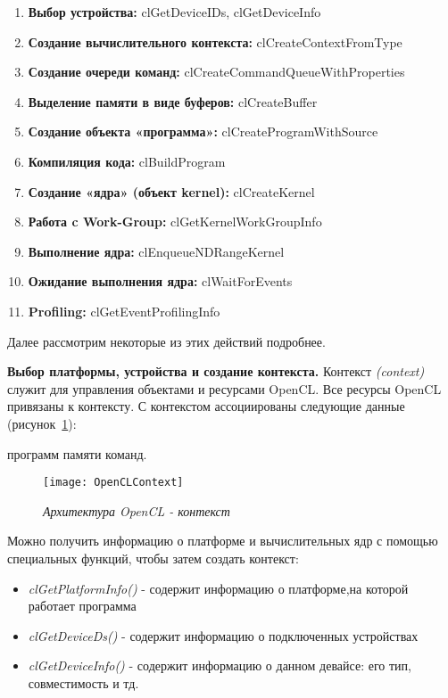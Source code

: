{\begin{enumerate}
			\item\textbf{Выбор устройства:} clGetDeviceIDs, clGetDeviceInfo
			\item\textbf{Создание вычислительного контекста:} clCreateContextFromType
			\item\textbf{Создание очереди команд:} clCreateCommandQueueWithProperties
			\item\textbf{Выделение памяти в виде буферов:} clCreateBuffer
			\item\textbf{Создание объекта «программа»:} clCreateProgramWithSource
			\item\textbf{Компиляция кода:} clBuildProgram
			\item\textbf{Создание «ядра» (объект kernel):} clCreateKernel
			\item\textbf{Работа c Work-Group:} clGetKernelWorkGroupInfo 
			\item\textbf{Выполнение ядра:} clEnqueueNDRangeKernel 
			\item\textbf{Ожидание выполнения ядра:} clWaitForEvents 
			\item\textbf{Profiling:} clGetEventProfilingInfo
		\end{enumerate}
	Далее рассмотрим некоторые из этих действий подробнее.
	\par\textbf{Выбор платформы, устройства и создание контекста.} Контекст \textit{(context)} служит для управления объектами и ресурсами OpenCL. Все ресурсы OpenCL привязаны к контексту. С контекстом ассоциированы следующие данные (рисунок~\ref{OpenCLContext:image}):
		\begin{itemize}
			 программ
			 памяти
			 команд.
		\end{itemize}
	\begin{figure}[H]
		\texttt{[image: OpenCLContext]}
		\caption{\textit{Архитектура OpenCL - контекст}}
		\label{OpenCLContext:image}
	\end{figure}
	Можно получить информацию о платформе и вычислительных ядр с помощью специальных функций, чтобы затем создать контекст:
		\begin{itemize}
			\item\textit{clGetPlatformInfo()} - содержит информацию о платформе,на которой работает программа
			\item\textit{clGetDeviceDs()} - содержит информацию о подключенных устройствах
			\item\textit{clGetDeviceInfo()} - содержит информацию о данном девайсе: его тип, совместимость и тд.

\end{itemize}}
